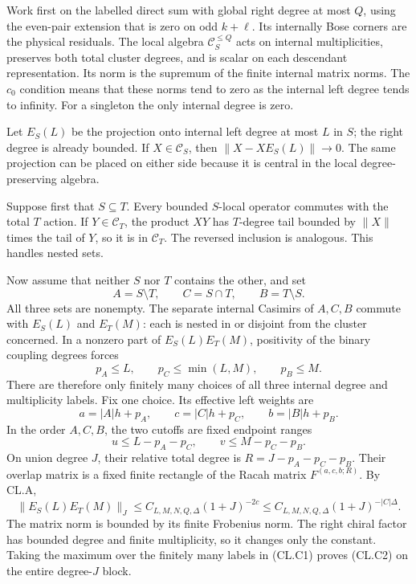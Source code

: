 Work first on the labelled direct sum with global right degree at most \(Q\), using the even-pair extension that is zero on odd \(k+\ell\). Its internally Bose corners are the physical residuals. The local algebra \(\mathcal C_S^{\leq Q}\) acts on internal multiplicities, preserves both total cluster degrees, and is scalar on each descendant representation. Its norm is the supremum of the finite internal matrix norms. The \(c_0\) condition means that these norms tend to zero as the internal left degree tends to infinity. For a singleton the only internal degree is zero.

Let \(E_S(L)\) be the projection onto internal left degree at most \(L\) in \(S\); the right degree is already bounded. If \(X\in\mathcal C_S\), then \(\|X-XE_S(L)\|\to0\). The same projection can be placed on either side because it is central in the local degree-preserving algebra.

Suppose first that \(S\subseteq T\). Every bounded \(S\)-local operator commutes with the total \(T\) action. If \(Y\in\mathcal C_T\), the product \(XY\) has \(T\)-degree tail bounded by \(\|X\|\) times the tail of \(Y\), so it is in \(\mathcal C_T\). The reversed inclusion is analogous. This handles nested sets.

Now assume that neither \(S\) nor \(T\) contains the other, and set \[
A=S\setminus T,\qquad C=S\cap T,\qquad B=T\setminus S.
\] All three sets are nonempty. The separate internal Casimirs of \(A,C,B\) commute with \(E_S(L)\) and \(E_T(M)\): each is nested in or disjoint from the cluster concerned. In a nonzero part of \(E_S(L)E_T(M)\), positivity of the binary coupling degrees forces \[
p_A\leq L,\qquad p_C\leq\min(L,M),\qquad p_B\leq M.
\tag{CL.C1}
\] There are therefore only finitely many choices of all three internal degree and multiplicity labels. Fix one choice. Its effective left weights are \[
a=|A|h+p_A,\qquad c=|C|h+p_C,\qquad b=|B|h+p_B.
\] In the order \(A,C,B\), the two cutoffs are fixed endpoint ranges \[
u\leq L-p_A-p_C,\qquad v\leq M-p_C-p_B.
\] On union degree \(J\), their relative total degree is \(R=J-p_A-p_C-p_B\). Their overlap matrix is a fixed finite rectangle of the Racah matrix \(F^{(a,c,b;R)}\). By CL.A, \[
\|E_S(L)E_T(M)\|_{J}
\leq C_{L,M,N,Q,\Delta}(1+J)^{-2c}
\leq C_{L,M,N,Q,\Delta}(1+J)^{-|C|\Delta}.
\tag{CL.C2}
\] The matrix norm is bounded by its finite Frobenius norm. The right chiral factor has bounded degree and finite multiplicity, so it changes only the constant. Taking the maximum over the finitely many labels in (CL.C1) proves (CL.C2) on the entire degree-\(J\) block.

